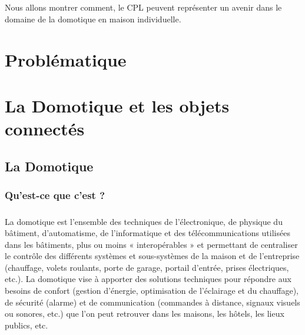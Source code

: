     \paragraph{}
Nous allons montrer comment, le CPL peuvent représenter un avenir dans le domaine de la domotique en maison individuelle.




\chapter*{Problématique}
    \paragraph{}
    \paragraph{}




\chapter{La Domotique et les objets connectés}
    \section{La Domotique}
        \subsection{Qu’est-ce que c’est ?}
            \paragraph{}
La domotique est l’ensemble des techniques de l'électronique, de physique du bâtiment, d'automatisme, de l'informatique et des télécommunications utilisées dans les bâtiments, plus ou moins « interopérables » et permettant de centraliser le contrôle des différents systèmes et sous-systèmes de la maison et de l'entreprise (chauffage, volets roulants, porte de garage, portail d'entrée, prises électriques, etc.).
La domotique vise à apporter des solutions techniques pour répondre aux besoins de confort (gestion d'énergie, optimisation de l'éclairage et du chauffage), de sécurité (alarme) et de communication (commandes à distance, signaux visuels ou sonores, etc.) que l'on peut retrouver dans les maisons, les hôtels, les lieux publics, etc.
